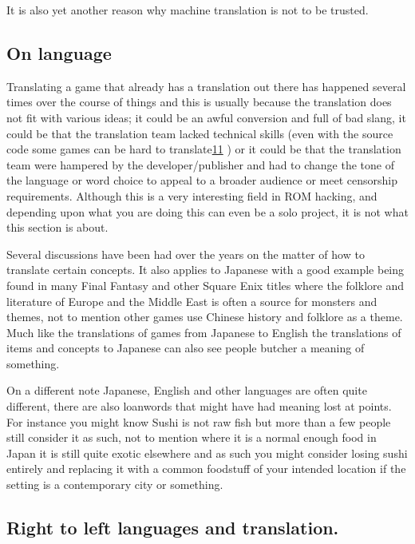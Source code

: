 \documentclass[
]{book}
\begin{document}
It is also yet another reason why machine translation is not to be trusted.

\hypertarget{on-language}{%
\subsection{On language}\label{on-language}}

Translating a game that already has a translation out there has happened several times over the course of things and this is usually because the translation does not fit with various ideas; it could be an awful conversion and full of bad slang, it could be that the translation team lacked technical skills (even with the source code some games can be hard to translate\href{romhacking202012.html\#fn11x0}{11} ) or it could be that the translation team were hampered by the developer/publisher and had to change the tone of the language or word choice to appeal to a broader audience or meet censorship requirements. Although this is a very interesting field in ROM hacking, and depending upon what you are doing this can even be a solo project, it is not what this section is about.

Several discussions have been had over the years on the matter of how to translate certain concepts. It also applies to Japanese with a good example being found in many Final Fantasy and other Square Enix titles where the folklore and literature of Europe and the Middle East is often a source for monsters and themes, not to mention other games use Chinese history and folklore as a theme. Much like the translations of games from Japanese to English the translations of items and concepts to Japanese can also see people butcher a meaning of something.

On a different note Japanese, English and other languages are often quite different, there are also loanwords that might have had meaning lost at points. For instance you might know Sushi is not raw fish but more than a few people still consider it as such, not to mention where it is a normal enough food in Japan it is still quite exotic elsewhere and as such you might consider losing sushi entirely and replacing it with a common foodstuff of your intended location if the setting is a contemporary city or something.

\hypertarget{right-to-left-languages-and-translation.}{%
\subsection{Right to left languages and translation.}\label{right-to-left-languages-and-translation.}}
\end{document}
